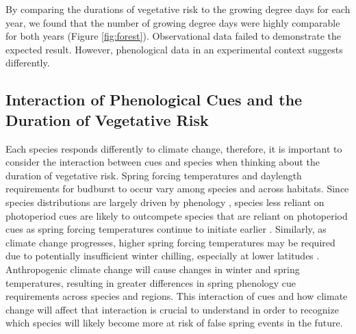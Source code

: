 \documentclass{article}\usepackage[]{graphicx}\usepackage[]{color}
\begin{document}
By comparing the durations of vegetative risk to the growing degree days for each year, we found that the number of growing degree days were highly comparable for both years (Figure \ref{fig:forest}). Observational data failed to demonstrate the expected result. However, phenological data in an experimental context suggests differently. %

\subsection{Interaction of Phenological Cues and the Duration of Vegetative Risk}
Each species responds differently to climate change, therefore, it is important to consider the interaction between cues and species when thinking about the duration of vegetative risk. Spring forcing temperatures and daylength requirements for budburst to occur vary among species and across habitats. Since species distributions are largely driven by phenology \citep{Chuine2001}, species less reliant on photoperiod cues are likely to outcompete species that are reliant on photoperiod cues as spring forcing temperatures continue to initiate earlier \citep{Vitasse2011, Gauzere2017}. Similarly, as climate change progresses, higher spring forcing temperatures may be required due to potentially insufficient winter chilling, especially at lower latitudes \citep{McCreary1990, Morin2009, Fu2012, Polgar2014, Chuine2010}. Anthropogenic climate change will cause changes in winter and spring temperatures, resulting in greater differences in spring phenology cue requirements across species and regions. This interaction of cues and how climate change will affect that interaction is crucial to understand in order to recognize which species will likely become more at risk of false spring events in the future.
\end{document}
